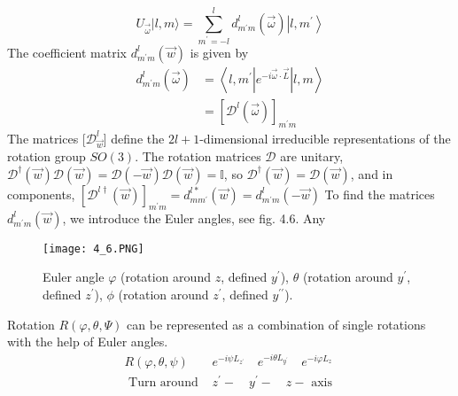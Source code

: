 \begin{equation}
    U_{\vec{\omega}}|l, m\rangle=\sum_{m^{\prime}=-l}^{l} d_{m^{\prime} m}^{l}(\vec{\omega})\left|l, m^{\prime}\right\rangle
    \end{equation}
The coefficient matrix $d^l_{m^{\prime}m}(\vec{w})$ is given by
\begin{equation}
\begin{aligned} d_{m^{\prime} m}^{l}(\vec{\omega}) &=\left\langle l, m^{\prime}\left|e^{-i \vec{\omega} \cdot \vec{L}}\right| l, m\right\rangle \\ &=\left[\mathcal{D}^{l}(\vec{\omega})\right]_{m^{\prime} m} \end{aligned}
\end{equation}
The matrices [$\mathcal{D}^l_{\vec{w}}$] define the $2l + 1$-dimensional irreducible representations of the rotation group $SO (3)$. The rotation matrices $\mathcal{D}$ are unitary, $\mathcal{D}^{\dagger}(\vec{w})\mathcal{D}(\vec{w})=\mathcal{D}(-\vec{w})\mathcal{D}(\vec{w}) = \mathbb{I}$, so $\mathcal{D}^{\dagger}(\vec{w})=\mathcal{D}(\vec{w})$, and in components, $[\mathcal{D}^{l\dagger}(\vec{w})]_{m^{\prime}m}=d^{l*}_{mm^{\prime}}(\vec{w})=d^l_{m^{\prime}m}(-\vec{w})$ To find the matrices $d^l_{m^{\prime}m}(\vec{w})$, we introduce the Euler angles, see fig. 4.6. Any
\begin{figure}[ht]
    \begin{minipage}{0.55\textwidth}
        \centering
        \texttt{[image: 4\_6.PNG]}
    \end{minipage}
    \begin{minipage}{0.45\textwidth}
        \caption{Euler angle $\varphi$ (rotation around $z$, defined $y^{\prime}$), $\theta$ (rotation around $y^{\prime}$, defined $z^{\prime}$), $\phi$ (rotation around $z^{\prime}$, defined $y^{\prime\prime}$).}
    \end{minipage}
\end{figure}
Rotation $R (\varphi, \theta, \Psi)$ can be represented as a combination of single rotations with the help of Euler angles.
\begin{equation}
\begin{aligned} R(\varphi, \theta, \psi) & e^{-i \psi L_{z^{\prime}}} \quad e^{-i \theta L_{y^{\prime}}} \quad e^{-i \varphi L_{z}} \\ \text { Turn around } & z^{\prime}-\quad y^{\prime}-\quad z-\text { axis } \end{aligned}
\end{equation}
